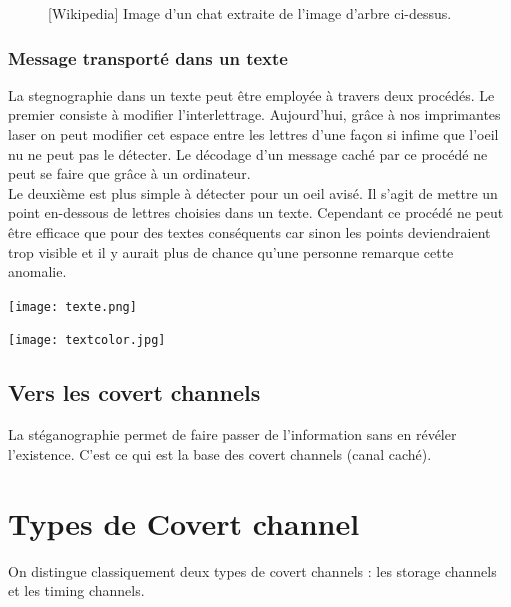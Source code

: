 \documentclass{acm_proc_article-sp}
\begin{document}
\begin{figure}
\centering
{}
\caption{[Wikipedia] Image d'un chat extraite de l'image d'arbre ci-dessus.}
\end{figure}

\subsubsection{Message transporté dans un texte}
La stegnographie dans un texte peut être employée à travers deux procédés. Le premier consiste à modifier l'interlettrage. Aujourd'hui, grâce à nos imprimantes laser on peut modifier cet espace entre les lettres d'une façon si infime que l'oeil nu ne peut pas le détecter. Le décodage d'un message caché par ce procédé ne peut se faire que grâce à un ordinateur.\\
Le deuxième est plus simple à détecter pour un oeil avisé. Il s'agit de mettre un point en-dessous de lettres choisies dans un texte. Cependant ce procédé ne peut être efficace que pour des textes conséquents car sinon les points deviendraient trop visible et il y aurait plus de chance qu'une personne remarque cette anomalie.

\begin{center}
\texttt{[image: texte.png]}
\end{center}


\begin{center}
\texttt{[image: textcolor.jpg]}
\end{center}

\subsection{Vers les covert channels}
La stéganographie permet de faire passer de l'information sans en révéler l'existence. C'est ce qui est la base des covert channels (canal caché).


\section{Types de Covert channel}
On distingue classiquement deux types de covert channels : les storage channels et les timing channels.
\end{document}
